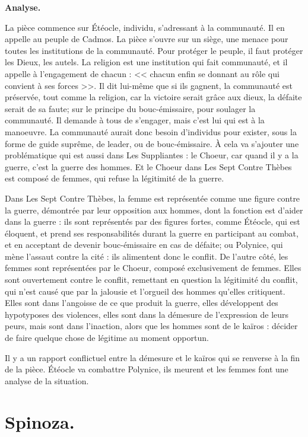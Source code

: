 \documentclass[11pt]{article}
\begin{document}
\bf{Analyse.}

La pièce commence sur Étéocle, individu, s'adressant à la communauté. Il en appelle au peuple de Cadmos. La pièce s'ouvre sur un siège, une menace pour toutes les institutions de la communauté. Pour protéger le peuple, il faut protéger les Dieux, les autels. La religion est une institution qui fait communauté, et il appelle à l'engagement de chacun : << chacun enfin se donnant au rôle qui convient à ses forces >>. Il dit lui-même que si ils gagnent, la communauté est préservée, tout comme la religion, car la victoire serait grâce aux dieux, la défaite serait de sa faute; sur le principe du bouc-émissaire, pour soulager la communauté. Il demande à tous de s'engager, mais c'est lui qui est à la manoeuvre. La communauté aurait donc besoin d'individus pour exister, sous la forme de guide suprême, de leader, ou de bouc-émissaire. À cela va s'ajouter une problématique qui est aussi dans Les Suppliantes : le Choeur, car quand il y a la guerre, c'est la guerre des hommes. Et le Choeur dans Les Sept Contre Thèbes est composé de femmes, qui refuse la légitimité de la guerre.

Dans Les Sept Contre Thèbes, la femme est représentée comme une figure contre la guerre, démontrée par leur opposition aux hommes, dont la fonction est d'aider dans la guerre : ils sont représentés par des figures fortes, comme Étéocle, qui est éloquent, et prend ses responsabilités durant la guerre en participant au combat, et en acceptant de devenir bouc-émissaire en cas de défaite; ou Polynice, qui mène l'assaut contre la cité : ils alimentent donc le conflit. De l'autre côté, les femmes sont représentées par le Choeur, composé exclusivement de femmes. Elles sont ouvertement contre le conflit, remettant en question la légitimité du conflit, qui n'est causé que par la jalousie et l'orgueil des hommes qu'elles critiquent. Elles sont dans l'angoisse de ce que produit la guerre, elles développent des hypotyposes des violences, elles sont dans la démesure de l'expression de leurs peurs, mais sont dans l'inaction, alors que les hommes sont de le kaïros : décider de faire quelque chose de légitime au moment opportun.

Il y a un rapport conflictuel entre la démesure et le kaïros qui se renverse à la fin de la pièce. Étéocle va combattre Polynice, ils meurent et les femmes font une analyse de la situation.



\pagebreak

\section{Spinoza.}
\end{document}
